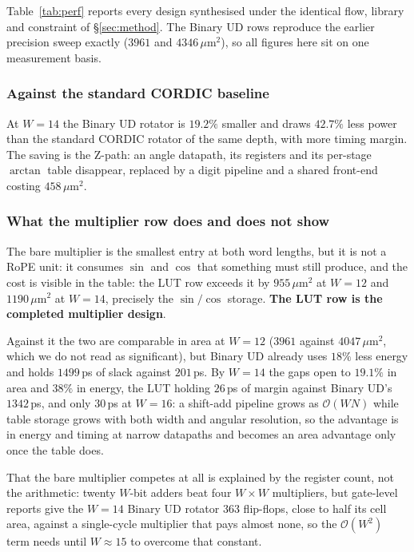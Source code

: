 \documentclass[conference]{IEEEtran}
\begin{document}
Table~\ref{tab:perf} reports every design synthesised under the identical flow,
library and constraint of \S\ref{sec:method}. The Binary UD rows reproduce the
earlier precision sweep exactly ($3961$ and $4346$\,$\mu$m$^2$), so all figures
here sit on one measurement basis.

\subsubsection{Against the standard CORDIC baseline}
At $W=14$ the Binary UD rotator is $19.2\%$ smaller and draws $42.7\%$ less
power than the standard CORDIC rotator of the same depth, with more timing
margin. The saving is the Z-path: an angle datapath, its registers and its
per-stage $\arctan$ table disappear, replaced by a digit pipeline and a shared
front-end costing $458$\,$\mu$m$^2$.

\subsubsection{What the multiplier row does and does not show}
The bare multiplier is the smallest entry at both word lengths, but it is not
a RoPE unit: it consumes $\sin$ and $\cos$ that something must still produce,
and the cost is visible in the table: the LUT row exceeds it by
$955$\,$\mu$m$^2$ at $W=12$ and $1190$\,$\mu$m$^2$ at $W=14$, precisely the
$\sin/\cos$ storage. \textbf{The LUT row is the completed multiplier design}.

Against it the two are comparable in area at $W=12$ ($3961$ against
$4047$\,$\mu$m$^2$, which we do not read as significant), but Binary UD
already uses $18\%$ less energy and holds $1499$\,ps of slack against
$201$\,ps. By $W=14$ the gaps open to $19.1\%$ in area and $38\%$ in energy,
the LUT holding $26$\,ps of margin against Binary UD's $1342$\,ps, and only
$30$\,ps at $W=16$: a shift-add pipeline grows as $\mathcal{O}(WN)$ while
table storage grows with both width
and angular resolution, so the advantage is in energy and timing at narrow
datapaths and becomes an area advantage only once the table does.

That the bare multiplier competes at all is explained by the register count,
not the arithmetic: twenty $W$-bit adders beat four $W\!\times\!W$
multipliers, but gate-level reports give the $W=14$ Binary UD rotator $363$
flip-flops, close to half its cell area, against a single-cycle
multiplier that pays almost none, so the $\mathcal{O}(W^2)$ term needs until
$W \approx 15$ to overcome that constant.
\end{document}
